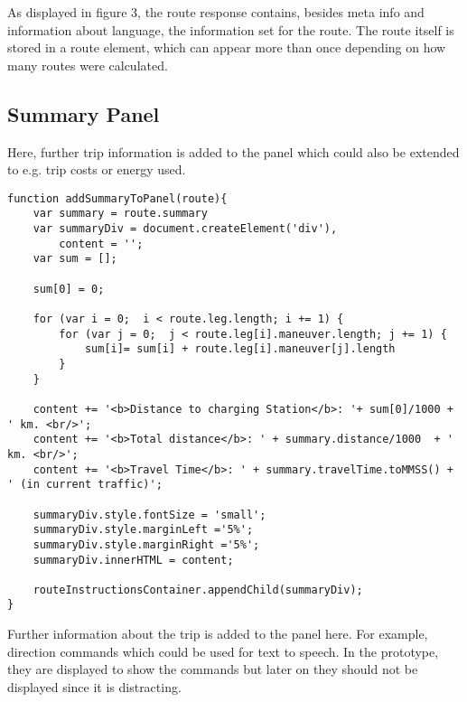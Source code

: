 As displayed in figure 3, the route response contains, besides meta info and information about language, the information set for the route. The route itself is stored in a route element, which can appear more than once depending on how many routes were calculated. 


\subsection{Summary Panel}

Here, further trip information is added to the panel which could also be extended to e.g. trip costs or energy used.

\begin{verbatim}
function addSummaryToPanel(route){
    var summary = route.summary
    var summaryDiv = document.createElement('div'),
        content = '';
    var sum = [];

    sum[0] = 0;

    for (var i = 0;  i < route.leg.length; i += 1) {
        for (var j = 0;  j < route.leg[i].maneuver.length; j += 1) {
            sum[i]= sum[i] + route.leg[i].maneuver[j].length
        }
    }

    content += '<b>Distance to charging Station</b>: '+ sum[0]/1000 + ' km. <br/>';
    content += '<b>Total distance</b>: ' + summary.distance/1000  + ' km. <br/>';
    content += '<b>Travel Time</b>: ' + summary.travelTime.toMMSS() + ' (in current traffic)';

    summaryDiv.style.fontSize = 'small';
    summaryDiv.style.marginLeft ='5%';
    summaryDiv.style.marginRight ='5%';
    summaryDiv.innerHTML = content;

    routeInstructionsContainer.appendChild(summaryDiv);
}
\end{verbatim}

Further information about the trip is added to the panel here. For example, direction commands which could be used for text to speech. In the prototype, they are displayed to show the commands but later on they should not be displayed since it is distracting.

